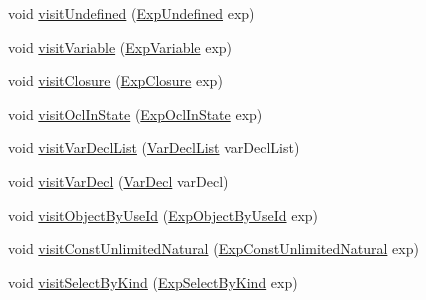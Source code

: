 \begin{DoxyCompactItemize}
\item 
void \hyperlink{interfaceorg_1_1tzi_1_1use_1_1uml_1_1ocl_1_1expr_1_1_expression_visitor_a2a89afab3898ba333a2b7f4e29165318}{visit\-Undefined} (\hyperlink{classorg_1_1tzi_1_1use_1_1uml_1_1ocl_1_1expr_1_1_exp_undefined}{Exp\-Undefined} exp)
\item 
void \hyperlink{interfaceorg_1_1tzi_1_1use_1_1uml_1_1ocl_1_1expr_1_1_expression_visitor_a4ec14432cd7faa9e369949685bbdf254}{visit\-Variable} (\hyperlink{classorg_1_1tzi_1_1use_1_1uml_1_1ocl_1_1expr_1_1_exp_variable}{Exp\-Variable} exp)
\item 
void \hyperlink{interfaceorg_1_1tzi_1_1use_1_1uml_1_1ocl_1_1expr_1_1_expression_visitor_a172a03aa002e967955164c7633679fb7}{visit\-Closure} (\hyperlink{classorg_1_1tzi_1_1use_1_1uml_1_1ocl_1_1expr_1_1_exp_closure}{Exp\-Closure} exp)
\item 
void \hyperlink{interfaceorg_1_1tzi_1_1use_1_1uml_1_1ocl_1_1expr_1_1_expression_visitor_a9ad21ec6cd34bbb7e993eeb6d94478e2}{visit\-Ocl\-In\-State} (\hyperlink{classorg_1_1tzi_1_1use_1_1uml_1_1ocl_1_1expr_1_1_exp_ocl_in_state}{Exp\-Ocl\-In\-State} exp)
\item 
void \hyperlink{interfaceorg_1_1tzi_1_1use_1_1uml_1_1ocl_1_1expr_1_1_expression_visitor_a6cca22eec927a463e882d2f04a23a5aa}{visit\-Var\-Decl\-List} (\hyperlink{classorg_1_1tzi_1_1use_1_1uml_1_1ocl_1_1expr_1_1_var_decl_list}{Var\-Decl\-List} var\-Decl\-List)
\item 
void \hyperlink{interfaceorg_1_1tzi_1_1use_1_1uml_1_1ocl_1_1expr_1_1_expression_visitor_a5157d4fa9a57987d9aee9a0617af2d55}{visit\-Var\-Decl} (\hyperlink{classorg_1_1tzi_1_1use_1_1uml_1_1ocl_1_1expr_1_1_var_decl}{Var\-Decl} var\-Decl)
\item 
void \hyperlink{interfaceorg_1_1tzi_1_1use_1_1uml_1_1ocl_1_1expr_1_1_expression_visitor_aff08bcb1d8ce4c3e080d8d57dd7cffe1}{visit\-Object\-By\-Use\-Id} (\hyperlink{classorg_1_1tzi_1_1use_1_1uml_1_1ocl_1_1expr_1_1_exp_object_by_use_id}{Exp\-Object\-By\-Use\-Id} exp)
\item 
void \hyperlink{interfaceorg_1_1tzi_1_1use_1_1uml_1_1ocl_1_1expr_1_1_expression_visitor_a10d2caca63601933097076b5306fc715}{visit\-Const\-Unlimited\-Natural} (\hyperlink{classorg_1_1tzi_1_1use_1_1uml_1_1ocl_1_1expr_1_1_exp_const_unlimited_natural}{Exp\-Const\-Unlimited\-Natural} exp)
\item 
void \hyperlink{interfaceorg_1_1tzi_1_1use_1_1uml_1_1ocl_1_1expr_1_1_expression_visitor_ab607fb1ad58953540e4ec0c1cbef8f30}{visit\-Select\-By\-Kind} (\hyperlink{classorg_1_1tzi_1_1use_1_1uml_1_1ocl_1_1expr_1_1_exp_select_by_kind}{Exp\-Select\-By\-Kind} exp)

\end{DoxyCompactItemize}
